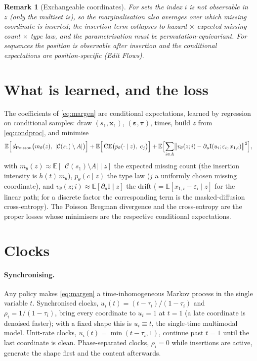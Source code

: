 \documentclass[11pt]{article}
\newtheorem{remark}{Remark}
\newcommand{\C}{\mathcal{C}}
\newcommand{\A}{A}
\newcommand{\E}{\mathbb{E}}
\newcommand{\bx}{\bm{x}}
\newcommand{\beps}{\bm{\varepsilon}}
\newcommand{\btau}{\bm{\tau}}
\newcommand{\Iu}{\mathrm{I}}
\begin{document}
\begin{remark}[Exchangeable coordinates]
For sets the index $i$ is not observable in $z$ (only the multiset is), so the marginalisation also averages over \emph{which} missing coordinate is inserted; the insertion term collapses to hazard $\times$ expected missing count $\times$ type law, and the parametrisation must be permutation-equivariant. For sequences the position is observable after insertion and the conditional expectations are position-specific (Edit Flows).
\end{remark}

\section{What is learned, and the loss}

The coefficients of \eqref{eq:margen} are conditional expectations, learned by regression on conditional samples: draw $(s_1,\bx_1)$, $(\beps,\btau)$, times, build $z$ from \eqref{eq:condproc}, and minimise
\begin{equation}
\label{eq:loss}
\E\Bigl[\,d_{\mathrm{Poisson}}\bigl(m_\theta(z),\ |\C(s_1)\setminus\A|\bigr)\Bigr]
+\E\Bigl[\,\mathrm{CE}\bigl(p_\theta(\cdot\mid z),\ c_j\bigr)\Bigr]
+\E\Bigl[\sum_{i\in\A}\bigl\|v_\theta(z;i)-\partial_u\Iu(u_i;\varepsilon_i,x_{1,i})\bigr\|^2\Bigr],
\end{equation}
with $m_\theta(z)\approx\E[\,|\C(s_1)\setminus\A|\mid z]$ the expected missing count (the insertion intensity is $h(t)\,m_\theta$), $p_\theta(c\mid z)$ the type law ($j$ a uniformly chosen missing coordinate), and $v_\theta(z;i)\approx\E[\partial_u\Iu\mid z]$ the drift ($=\E[x_{1,i}-\varepsilon_i\mid z]$ for the linear path; for a discrete factor the corresponding term is the masked-diffusion cross-entropy). The Poisson Bregman divergence and the cross-entropy are the proper losses whose minimisers are the respective conditional expectations.

\section{Clocks}

\paragraph{Synchronising.}
Any policy makes \eqref{eq:margen} a time-inhomogeneous Markov process in the single variable $t$. Synchronised clocks, $u_i(t)=(t-\tau_i)/(1-\tau_i)$ and $\rho_i=1/(1-\tau_i)$, bring every coordinate to $u_i=1$ at $t=1$ (a late coordinate is denoised faster); with a fixed shape this is $u_i\equiv t$, the single-time multimodal model. Unit-rate clocks, $u_i(t)=\min(t-\tau_i,1)$, continue past $t=1$ until the last coordinate is clean. Phase-separated clocks, $\rho_i=0$ while insertions are active, generate the shape first and the content afterwards.
\end{document}
